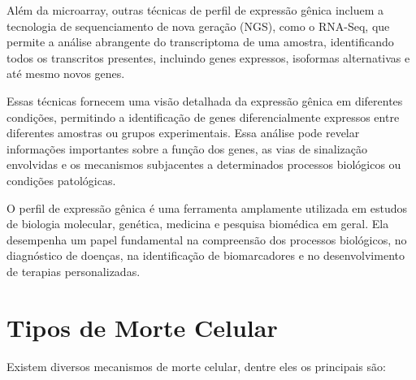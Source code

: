 \documentclass[11pt,a4paper]{article}
\begin{document}
		Além da microarray, outras técnicas de perfil de expressão gênica incluem a tecnologia de sequenciamento de nova geração (NGS), como o RNA-Seq, que permite a análise abrangente do transcriptoma de uma amostra, identificando todos os transcritos presentes, incluindo genes expressos, isoformas alternativas e até mesmo novos genes.
	
		Essas técnicas fornecem uma visão detalhada da expressão gênica em diferentes condições, permitindo a identificação de genes diferencialmente expressos entre diferentes amostras ou grupos experimentais. Essa análise pode revelar informações importantes sobre a função dos genes, as vias de sinalização envolvidas e os mecanismos subjacentes a determinados processos biológicos ou condições patológicas.
	
		O perfil de expressão gênica é uma ferramenta amplamente utilizada em estudos de biologia molecular, genética, medicina e pesquisa biomédica em geral. Ela desempenha um papel fundamental na compreensão dos processos biológicos, no diagnóstico de doenças, na identificação de biomarcadores e no desenvolvimento de terapias personalizadas.

	\section{Tipos de Morte Celular}

		Existem diversos mecanismos de morte celular, dentre eles os principais são:
\end{document}
